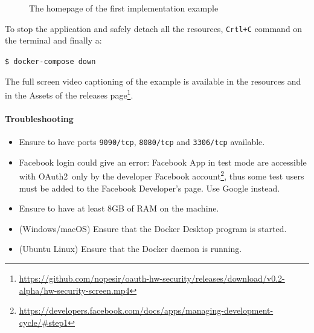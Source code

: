 \documentclass[a4paper,12pt]{article}
\def\oauth{OAuth2\xspace}
\begin{document}
\begin{figure}[ht]
    \centering
    \caption{The homepage of the first implementation example}
    \label{fig:home1}
\end{figure}

To stop the application and safely detach all the resources, \texttt{Crtl+C} command on the terminal and finally a:

\quad \texttt{\$ docker-compose down}

The full screen video captioning of the example is available in the resources and in the Assets of the releases page\footnote{\scriptsize{\url{https://github.com/nopesir/oauth-hw-security/releases/download/v0.2-alpha/hw-security-screen.mp4}}}. 

\paragraph{Troubleshooting}
\begin{itemize}
    \item Ensure to have ports \texttt{9090/tcp}, \texttt{8080/tcp} and \texttt{3306/tcp} available.
    \item Facebook login could give an error: Facebook App in test mode are accessible with \oauth\ only by the developer Facebook account\footnote{\url{https://developers.facebook.com/docs/apps/managing-development-cycle/\#step1}}, thus some test users must be added to the Facebook Developer's page. Use Google instead.
    \item Ensure to have at least 8GB of RAM on the machine.
    \item (Windows/macOS) Ensure that the Docker Desktop program is started.
    \item (Ubuntu Linux) Ensure that the Docker daemon is running.
\end{itemize}
\end{document}
